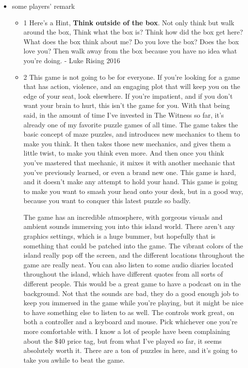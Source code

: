 \documentclass[11pt]{article}
\begin{document}
\begin{itemize}
\item some players' remark
\label{sec:orgheadline58}

\begin{itemize}
\item 1
\label{sec:orgheadline56}
Here’s a Hint, \textbf{Think outside of the box}. Not only think but walk around the box,
Think what the box is? Think how did the box get here? What does the box think
about me? Do you love the box? Does the box love you? Then walk away from the
box because you have no idea what you’re doing. - Luke Rising 2016

\item 2
\label{sec:orgheadline57}
This game is not going to be for everyone. If you're looking for a game that has
action, violence, and an engaging plot that will keep you on the edge of your
seat, look elsewhere. If you're impatient, and if you don't want your brain to
hurt, this isn't the game for you. With that being said, in the amount of time
I've invested in The Witness so far, it's already one of my favorite puzzle
games of all time. The game takes the basic concept of maze puzzles, and
introduces new mechanics to them to make you think. It then takes those new
mechanics, and gives them a little twist, to make you think even more. And then
once you think you've mastered that mechanic, it mixes it with another mechanic
that you've previously learned, or even a brand new one. This game is hard, and
it doesn't make any attempt to hold your hand. This game is going to make you
want to smash your head onto your desk, but in a good way, because you want to
conquer this latest puzzle so badly.

The game has an incredible atmosphere, with gorgeous visuals and ambient sounds
immersing you into this island world. There aren't any graphics settings, which
is a huge bummer, but hopefully that is something that could be patched into the
game. The vibrant colors of the island really pop off the screen, and the
different locations throughout the game are really neat. You can also listen to
some audio diaries located throughout the island, which have different quotes
from all sorts of different people. This would be a great game to have a podcast
on in the background. Not that the sounds are bad, they do a good enough job to
keep you immersed in the game while you're playing, but it might be nice to have
something else to listen to as well. The controls work great, on both a
controller and a keyboard and mouse. Pick whichever one you're more comfortable
with. I know a lot of people have been complaining about the \$40 price tag, but
from what I've played so far, it seems absolutely worth it. There are a ton of
puzzles in here, and it's going to take you awhile to beat the game.


\end{itemize}
\end{itemize}
\end{document}
